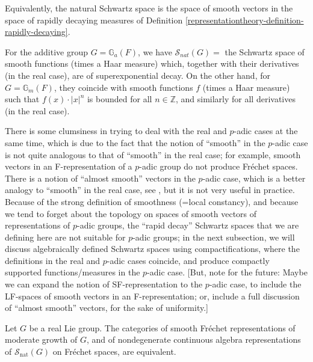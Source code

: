 Equivalently, the natural Schwartz space is the space of smooth vectors in the space of rapidly decaying measures of Definition \ref{representationtheory-definition-rapidly-decaying}. 


\begin{example}
 \label{example-natural-Schwartz-additive-multiplicative}
For the additive group $G=\mathbb G_a(F)$, we have $\mathcal S_{nat}(G)=$ the Schwartz space of smooth functions (times a Haar measure) which, together with their derivatives (in the real case), are of superexponential decay. On the other hand, for $G=\mathbb G_m(F)$, they coincide with smooth functions $f$ (times a Haar measure) such that $f(x)\cdot |x|^n$ is bounded for all $n\in \mathbb Z$, and similarly for all derivatives (in the real case).
\end{example}

\begin{remark}
 \label{remark-almost-smooth}
There is some clumsiness in trying to deal with the real and $p$-adic cases at the same time, which is due to the fact that the notion of ``smooth'' in the $p$-adic case is not quite analogous to that of ``smooth'' in the real case; for example, smooth vectors in an F-representation of a $p$-adic group do not produce Fr\'echet spaces. There is a notion of ``almost smooth'' vectors in the $p$-adic case, which is a better analogy to ``smooth'' in the real case, see \cite{Sakellaridis-beyond1}, but it is not very useful in practice. Because of the strong definition of smoothness (=local constancy), and because we tend to forget about the topology on spaces of smooth vectors of representations of $p$-adic groups, the ``rapid decay'' Schwartz spaces that we are defining here are not suitable for $p$-adic groups; in the next subsection, we will discuss algebraically defined Schwartz spaces using compactifications, where the definitions in the real and $p$-adic cases coincide, and produce compactly supported functions/measures in the $p$-adic case. [But, note for the future: Maybe we can expand the notion of SF-representation to the $p$-adic case, to include the LF-spaces of smooth vectors in an F-representation; or, include a full discussion of ``almost smooth'' vectors, for the sake of uniformity.]
\end{remark}



\begin{proposition}
 \label{proposition-SF-Schwartz-equivalence}
Let $G$ be a real Lie group. The categories of smooth Fr\'echet representations of moderate growth of $G$, and of nondegenerate continuous algebra representations of $\mathcal S_{\text{nat}}(G)$ on Fr\'echet spaces, are equivalent.
\end{proposition}

